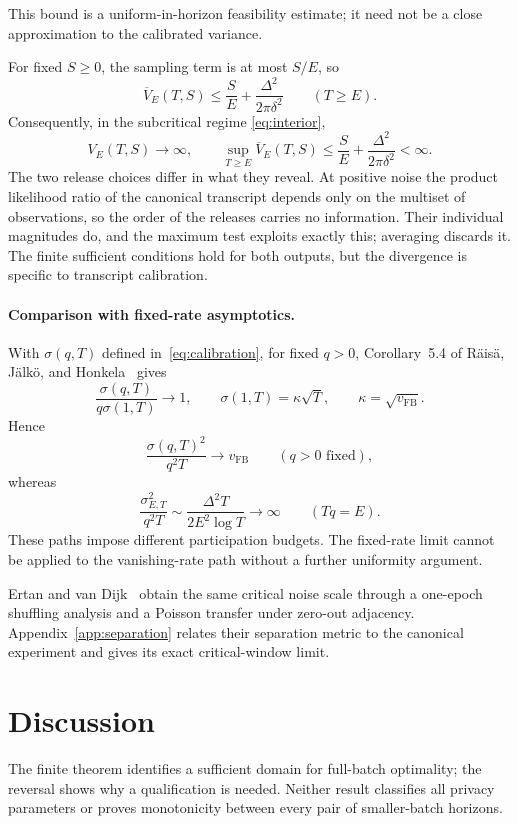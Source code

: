 \documentclass[11pt]{article}
\theoremstyle{remark}
\begin{document}
This bound is a uniform-in-horizon feasibility estimate; it need not be a
close approximation to the calibrated variance.

For fixed $S\geq0$, the sampling term is at most $S/E$, so
\[
 \overline V_E(T,S)\leq\frac SE+\frac{\Delta^2}{2\pi\delta^2}
 \qquad(T\geq E).
\]
Consequently, in the subcritical regime \eqref{eq:interior},
\[
 V_E(T,S)\longrightarrow\infty,\qquad
 \sup_{T\geq E}\overline V_E(T,S)
 \leq\frac SE+\frac{\Delta^2}{2\pi\delta^2}<\infty.
\]
The two release choices differ in what they reveal. At positive noise the
product likelihood ratio of the canonical transcript depends only on the
multiset of observations, so the order of the releases carries no
information. Their individual magnitudes do, and the maximum test exploits
exactly this; averaging discards it. The finite sufficient conditions hold
for both outputs, but the divergence is specific to transcript calibration.

\paragraph{Comparison with fixed-rate asymptotics.}
With $\sigma(q,T)$ defined in~\eqref{eq:calibration}, for fixed $q>0$,
Corollary~5.4 of R\"ais\"a, J\"alk\"o, and
Honkela~\cite{raisa2024} gives
\[
 \frac{\sigma(q,T)}{q\sigma(1,T)}\to1,\qquad
 \sigma(1,T)=\kappa\sqrt T,\qquad
 \kappa=\sqrt{v_{\mathrm{FB}}}.
\]
Hence
\begin{equation}\label{eq:fixedratecontrast}
 \frac{\sigma(q,T)^2}{q^2T}\to v_{\mathrm{FB}}
 \qquad(q>0\text{ fixed}),
\end{equation}
whereas
\begin{equation}\label{eq:fixedepochcontrast}
 \frac{\sigma_{E,T}^2}{q^2T}
 \sim\frac{\Delta^2T}{2E^2\log T}\to\infty
 \qquad(Tq=E).
\end{equation}
These paths impose different participation budgets. The fixed-rate limit
cannot be applied to the vanishing-rate path without a further uniformity
argument.

Ertan and van Dijk~\cite{ertanvandijk2026} obtain the same critical noise scale
through a one-epoch shuffling analysis and a Poisson transfer under zero-out
adjacency. Appendix~\ref{app:separation} relates their separation metric to
the canonical experiment and gives its exact critical-window limit.

\section{Discussion}
The finite theorem identifies a sufficient domain for full-batch optimality;
the reversal shows why a qualification is needed. Neither result classifies
all privacy parameters or proves monotonicity between every pair of
smaller-batch horizons.
\end{document}

